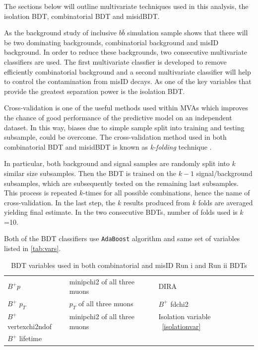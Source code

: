 The sections below will outline multivariate techniques used in this analysis, the isolation BDT, combinatorial BDT and misidBDT.

As the background study of inclusive $b\bar{b}$ simulation sample shows that there will be two dominating backgrounds, combinatorial background and misID background. In order to reduce these backgrounds, two consecutive multivariate classifiers are used. The first multivariate classfier is developed to remove efficiently combinatorial background and a second multivariate classifier will help to control the contamination from misID decays. As one of the key variables that provide the greatest separation power is the isolation BDT.

Cross-validation is one of the useful methods used within MVAs which improves the chance of good performance of the predictive model on an independent dataset. In this way, biases due to simple sample split into training and testing subsample, could be overcome. The cross-validation method used in both combinatorial BDT and misidBDT is known as \textit{k-folding} technique \cite{kfold}. 

In particular, both background and signal samples are randomly split into $k$ similar size subsamples. Then the BDT is trained on the $k-1$ signal/background subsamples, which are subsequently tested on the remaining last subsamples. This process is repeated $k$-times for all possible combinations, hence the name of cross-validation. In the last step, the $k$ results produced from $k$ folds are averaged yielding final estimate. In the two consecutive BDTs, number of folds used is $k$=10.

Both of the BDT classifiers use \texttt{AdaBoost} algorithm and same set of variables listed in \autoref{tab:vars}.

\begin{table}[h!]
\begin{center}
\begin{tabular}{| l  l  l |} \hline
$B^{+} p$ & \gls{minipchi2} of all three muons & \gls{DIRA} \\
$B^{+}$ $p_T$ & $p_{T}$ of all three muons & $B^{+}$ \gls{fdchi2} \\ 
$B^{+}$ \gls{vertexchi2ndof} & \gls{minipchi2} of all three muons  & Isolation variable ~\autoref{isolationvar} \\
$B^{+}$ lifetime &  &  \\ \hline
\end{tabular}
\end{center}
\caption{BDT variables used in both combinatorial and misID Run \Rn{1} and Run \Rn{2} BDTs}
\label{tab:vars}
\end{table}


